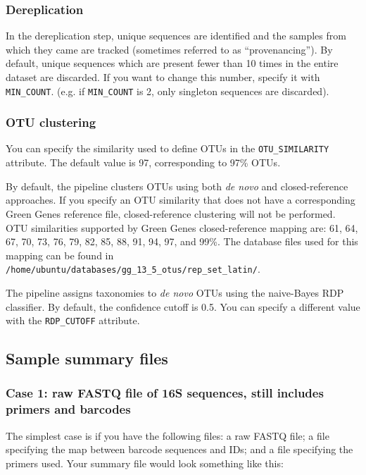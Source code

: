 \documentclass[11pt, oneside]{article}   	%
\begin{document}
\subsubsection{Dereplication}

In the dereplication step, unique sequences are identified and the
samples from which they came are tracked (sometimes referred to as 
``provenancing''). By default, unique sequences which are present fewer
than 10 times in the entire dataset are discarded. If you want to change
this number, specify it with \texttt{MIN\_COUNT}.  (e.g. if \texttt{MIN\_COUNT}
is 2, only singleton sequences are discarded).

\subsubsection{OTU clustering}

You can specify the similarity used to define OTUs in the \texttt{OTU\_SIMILARITY}
attribute. The default value is 97, corresponding to 97\% OTUs.

By default, the pipeline clusters OTUs using both \textit{de novo} and closed-reference
approaches. If you specify an OTU similarity that does not have a corresponding
Green Genes reference file, closed-reference clustering will not be performed. 
OTU similarities supported by Green Genes closed-reference mapping are: 61, 64, 67, 70, 73, 76, 79, 82, 85, 88, 91, 94, 97, and 99\%. 
The database files used for this mapping can be found in \texttt{/home/ubuntu/databases/gg\_13\_5\_otus/rep\_set\_latin/}.

The pipeline assigns taxonomies to \textit{de novo} OTUs using the naive-Bayes RDP
classifier. By default, the confidence cutoff is 0.5. You can specify a different
value with the \texttt{RDP\_CUTOFF} attribute.

\subsection{Sample summary files}

\subsubsection{Case 1: raw FASTQ file of 16S sequences, still includes primers and barcodes}\label{sec:case1}

The simplest case is if you have the following files: a raw FASTQ file; a file specifying the map between barcode sequences and IDs; and a file specifying the primers used.  Your summary file would look something like this:
\end{document}
